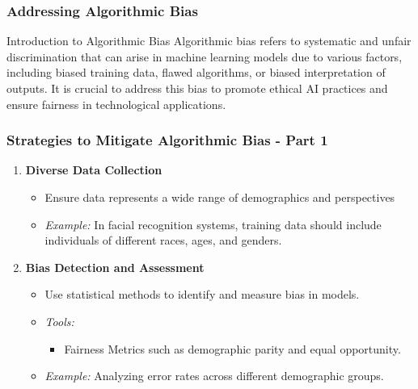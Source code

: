 \documentclass[aspectratio=169]{beamer}
\begin{document}
\begin{frame}[fragile]
    \frametitle{Addressing Algorithmic Bias}
    \begin{block}{Introduction to Algorithmic Bias}
        Algorithmic bias refers to systematic and unfair discrimination that can arise in machine learning models due to various factors, including biased training data, flawed algorithms, or biased interpretation of outputs. 
        It is crucial to address this bias to promote ethical AI practices and ensure fairness in technological applications.
    \end{block}
\end{frame}

\begin{frame}[fragile]
    \frametitle{Strategies to Mitigate Algorithmic Bias - Part 1}
    \begin{enumerate}
        \item \textbf{Diverse Data Collection}
        \begin{itemize}
            \item Ensure data represents a wide range of demographics and perspectives
            \item \textit{Example:} In facial recognition systems, training data should include individuals of different races, ages, and genders.
        \end{itemize}
        
        \item \textbf{Bias Detection and Assessment}
        \begin{itemize}
            \item Use statistical methods to identify and measure bias in models.
            \item \textit{Tools:} 
            \begin{itemize}
                \item Fairness Metrics such as demographic parity and equal opportunity.
            \end{itemize}
            \item \textit{Example:} Analyzing error rates across different demographic groups.
        \end{itemize}
    \end{enumerate}
\end{frame}
\end{document}
